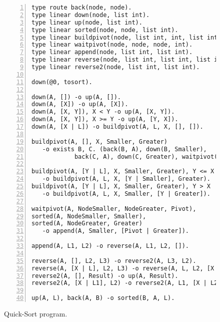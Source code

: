 \begin{figure}[h!]
\small\begin{Verbatim}[numbers=left]
type route back(node, node).
type linear down(node, list int).
type linear up(node, list int).
type linear sorted(node, node, list int).
type linear buildpivot(node, list int, int, list int, list int).
type linear waitpivot(node, node, node, int).
type linear append(node, list int, list int).
type linear reverse(node, list int, list int, list int).
type linear reverse2(node, list int, list int).

down(@0, tosort).

down(A, []) -o up(A, []).
down(A, [X]) -o up(A, [X]).
down(A, [X, Y]), X < Y -o up(A, [X, Y]).
down(A, [X, Y]), X >= Y -o up(A, [Y, X]).
down(A, [X | L]) -o buildpivot(A, L, X, [], []).

buildpivot(A, [], X, Smaller, Greater)
   -o exists B, C. (back(B, A), down(B, Smaller),
            back(C, A), down(C, Greater), waitpivot(A, B, C, X)).

buildpivot(A, [Y | L], X, Smaller, Greater), Y <= X
   -o buildpivot(A, L, X, [Y | Smaller], Greater).
buildpivot(A, [Y | L], X, Smaller, Greater), Y > X
   -o buildpivot(A, L, X, Smaller, [Y | Greater]).
   
waitpivot(A, NodeSmaller, NodeGreater, Pivot),
sorted(A, NodeSmaller, Smaller),
sorted(A, NodeGreater, Greater)
   -o append(A, Smaller, [Pivot | Greater]).

append(A, L1, L2) -o reverse(A, L1, L2, []).

reverse(A, [], L2, L3) -o reverse2(A, L3, L2).
reverse(A, [X | L], L2, L3) -o reverse(A, L, L2, [X | L3]).
reverse2(A, [], Result) -o up(A, Result).
reverse2(A, [X | L1], L2) -o reverse2(A, L1, [X | L2]).

up(A, L), back(A, B) -o sorted(B, A, L).
\end{Verbatim}
  \caption{Quick-Sort program.}
  \label{code:quicksort}
\end{figure}
\normalsize


